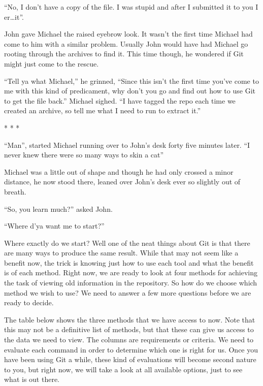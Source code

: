 \begin{trenches}
``No, I don't have a copy of the file.  I was stupid and after I submitted it to you I er\ldots\deleted it''.  

John gave Michael the raised eyebrow look.  It wasn't the first time Michael had come to him with a similar problem.  Usually John would have had Michael go rooting through the archives to find it.  This time though, he wondered if Git might just come to the rescue.

``Tell ya what Michael,'' he grinned, ``Since this isn't the first time you've come to me with this kind of predicament, why don't you go and find out how to use Git to get the file back.''  Michael sighed.  ``I have tagged the repo each time we created an archive, so tell me what I need to run to extract it.''

\begin{center} * * * \end{center}

``Man'', started Michael running over to John's desk forty five minutes later.  ``I never knew there were so many ways to skin a cat''

Michael was a little out of shape and though he had only crossed a minor distance, he now stood there, leaned over John's desk ever so slightly out of breath.

``So, you learn much?'' asked John.

``Where d'ya want me to start?''

\end{trenches}

Where exactly do we start?  Well one of the neat things about Git is that there are many ways to produce the same result.  While that may not seem like a benefit now, the trick is knowing just how to use each tool and what the benefit is of each method.  Right now, we are ready to look at four methods for achieving the task of viewing old information in the repository.  So how do we choose which method we wish to use?  We need to answer a few more questions before we are ready to decide.

The table below shows the three methods that we have access to now.  Note that this may not be a definitive list of methods, but that these can give us access to the data we need to view.  The columns are requirements or criteria.  We need to evaluate each command in order to determine which one is right for us.  Once you have been using Git a while, these kind of evaluations will become second nature to you, but right now, we will take a look at all available options, just to see what is out there.

